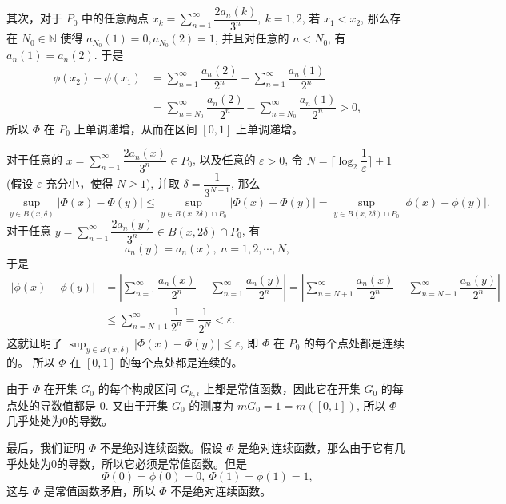 \begin{solution}
\begin{enumerate}
    其次，对于 \(P_0\) 中的任意两点 \(x_k = \displaystyle \sum\limits_{n=1}^{\infty} \dfrac{2a_n(k)}{3^n}, ~ k = 1, 2\), 若 \(x_1 < x_2\), 那么存在 \(N_0 \in \mathbb{N}\) 使得 \(a_{N_0}(1) = 0, a_{N_0}(2) = 1\), 并且对任意的 \(n < N_0\), 有 \(a_n(1) = a_n(2)\). 于是
    \[\begin{aligned}
    \phi(x_2) - \phi(x_1) & = \sum\limits_{n=1}^{\infty} \dfrac{a_n(2)}{2^n} - \sum\limits_{n=1}^{\infty} \dfrac{a_n(1)}{2^n} \\
    & = \sum\limits_{n=N_0}^{\infty} \dfrac{a_n(2)}{2^n} - \sum\limits_{n=N_0}^{\infty} \dfrac{a_n(1)}{2^n} > 0,
    \end{aligned}\]
    所以 \(\Phi\) 在 \(P_0\) 上单调递增，从而在区间 \([0, 1]\) 上单调递增。

    对于任意的 \(\displaystyle x = \sum\limits_{n=1}^{\infty} \dfrac{2a_n(x)}{3^n} \in P_0\), 以及任意的 \(\varepsilon > 0\), 令 \(N = \lceil \log_2 \dfrac{1}{\varepsilon} \rceil + 1\) (假设 \(\varepsilon\) 充分小，使得 \(N \geqslant 1\)), 并取 \(\delta = \dfrac{1}{3^{N+1}}\), 那么
    \[\sup_{y \in B(x, \delta)} \lvert \Phi(x) - \Phi(y) \rvert \leqslant \sup_{y \in B(x, 2\delta) \cap P_0} \lvert \Phi(x) - \Phi(y) \rvert = \sup_{y \in B(x, 2\delta) \cap P_0} \lvert \phi(x) - \phi(y) \rvert.\]
    对于任意 \(\displaystyle y = \sum\limits_{n=1}^{\infty} \dfrac{2a_n(y)}{3^n} \in B(x, 2\delta) \cap P_0\), 有
    \[a_n(y) = a_n(x), ~ n = 1, 2, \cdots, N,\]
    于是
    \[\begin{aligned}
    \lvert \phi(x) - \phi(y) \rvert & = \left\lvert \sum\limits_{n=1}^{\infty} \dfrac{a_n(x)}{2^n} - \sum\limits_{n=1}^{\infty} \dfrac{a_n(y)}{2^n} \right\rvert = \left\lvert \sum\limits_{n=N+1}^{\infty} \dfrac{a_n(x)}{2^n} - \sum\limits_{n=N+1}^{\infty} \dfrac{a_n(y)}{2^n} \right\rvert \\
    & \leqslant \sum\limits_{n=N+1}^{\infty} \dfrac{1}{2^n} = \dfrac{1}{2^{N}} < \varepsilon.
    \end{aligned}\]
    这就证明了 \(\displaystyle \sup_{y \in B(x, \delta)} \lvert \Phi(x) - \Phi(y) \rvert \leqslant \varepsilon\), 即 \(\Phi\) 在 \(P_0\) 的每个点处都是连续的。 所以 \(\Phi\) 在 \([0, 1]\) 的每个点处都是连续的。

    由于 \(\Phi\) 在开集 \(G_0\) 的每个构成区间 \(G_{k, i}\) 上都是常值函数，因此它在开集 \(G_0\) 的每点处的导数值都是 \(0\). 又由于开集 \(G_0\) 的测度为 \(m G_0 = 1 = m ([0, 1])\), 所以 \(\Phi\) 几乎处处为0的导数。

    最后，我们证明 \(\Phi\) 不是绝对连续函数。假设 \(\Phi\) 是绝对连续函数，那么由于它有几乎处处为0的导数，所以它必须是常值函数。但是
    \[\Phi(0) = \phi(0) = 0, ~ \Phi(1) = \phi(1) = 1,\]
    这与 \(\Phi\) 是常值函数矛盾，所以 \(\Phi\) 不是绝对连续函数。


\end{enumerate}
\end{solution}
